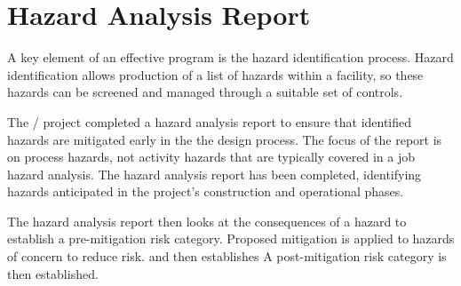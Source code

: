 \section{Hazard Analysis Report}

A key element of an effective  program is the hazard
identification process. Hazard identification allows production of a
list of hazards within a facility, so these hazards can be screened
and managed through a suitable set of controls.

The / project completed a hazard analysis
report to ensure that identified hazards are mitigated early in the
the design process.  The focus of the report is on process hazards,
not activity hazards that are typically covered in a job hazard
analysis.  The hazard analysis report has been completed, identifying
hazards anticipated in the project's construction and operational
phases.

The hazard analysis report then looks at the consequences of a hazard
to establish a pre-mitigation risk category. Proposed mitigation is
applied to hazards of concern to reduce risk. and then establishes A
post-mitigation risk category is then established.

